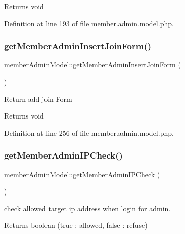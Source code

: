 \begin{DoxyReturn}{Returns}
void 
\end{DoxyReturn}


Definition at line 193 of file member.\+admin.\+model.\+php.

\hypertarget{classmemberAdminModel_a5cd67d34e825a2afa0fb871bd10aadb9}{}\label{classmemberAdminModel_a5cd67d34e825a2afa0fb871bd10aadb9} 
\subsubsection{\texorpdfstring{get\+Member\+Admin\+Insert\+Join\+Form()}{getMemberAdminInsertJoinForm()}}
{\footnotesize\ttfamily member\+Admin\+Model\+::get\+Member\+Admin\+Insert\+Join\+Form (\begin{DoxyParamCaption}{ }\end{DoxyParamCaption})}

Return add join Form

\begin{DoxyReturn}{Returns}
void 
\end{DoxyReturn}


Definition at line 256 of file member.\+admin.\+model.\+php.

\hypertarget{classmemberAdminModel_a26f6b31630804f56a79156f59c0f7603}{}\label{classmemberAdminModel_a26f6b31630804f56a79156f59c0f7603} 
\subsubsection{\texorpdfstring{get\+Member\+Admin\+I\+P\+Check()}{getMemberAdminIPCheck()}}
{\footnotesize\ttfamily member\+Admin\+Model\+::get\+Member\+Admin\+I\+P\+Check (\begin{DoxyParamCaption}{ }\end{DoxyParamCaption})}

check allowed target ip address when login for admin.

\begin{DoxyReturn}{Returns}
boolean (true \+: allowed, false \+: refuse) 
\end{DoxyReturn}


